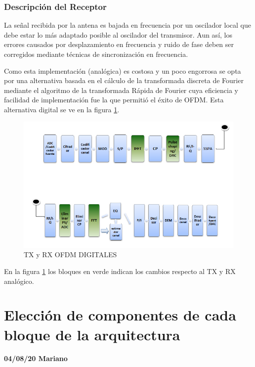 \documentclass[a4paper,12pt]{report} %
\begin{document}
\subsection{Descripción del Receptor} %

La señal recibida por la antena es bajada en frecuencia por un oscilador local que debe estar lo más adaptado posible al oscilador del transmisor. Aun así, los errores causados por desplazamiento en frecuencia y ruido de fase deben ser corregidos mediante técnicas de sincronización en frecuencia.





Como esta implementación (analógica) es costosa y un poco engorrosa se opta por una alternativa basada en el cálculo de la transformada discreta de Fourier mediante el algoritmo de la transformada Rápida de Fourier cuya eficiencia y facilidad de implementación fue la que permitió el éxito de OFDM. Esta alternativa digital se ve en la figura \ref{alt_dig}.

\begin{figure}[H]
	\centering
	\includegraphics[scale=0.9]{Imagenes/Arquitectura/alt_dig}
	\caption{TX y RX OFDM DIGITALES}
	\label{alt_dig}
\end{figure}

En la figura \ref{alt_dig} los bloques en verde indican los cambios respecto al TX y RX analógico.


\chapter{Elección de componentes de cada bloque de la arquitectura}

\textbf{04/08/20 Mariano}
\end{document}
